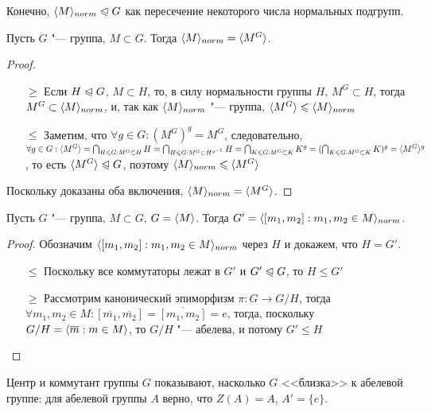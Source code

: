 \begin{note}
	Конечно, $\langle M\rangle_{norm} \trianglelefteqslant G$ как пересечение некоторого числа нормальных подгрупп.
\end{note}

\begin{proposition}
	Пусть $G$ "--- группа, $M \subset G$. Тогда $\gl M\gr_{norm}\hm = \gl M^G\gr$.
\end{proposition}

\begin{proof}~
	\begin{itemize}
		\item[$\ge$] Если $H \trianglelefteqslant G$, $M \subset H$, то, в силу нормальности группы $H$, $M^G \subset H$, тогда $M^G \hm\subset \gl M\gr_{norm}$, и, так как $\langle M\rangle_{norm}$ "--- группа, $\langle M^G\rangle \leqslant \langle M\rangle_{norm}$
		\item[$\le$] Заметим, что $\forall g \in G: (M^G)^g = M^G$, следовательно, $\forall g \in G: \gl M^G\gr \hm= \bigcap_{H \le G: M^G \subset H}H = \bigcap_{H\le G: M^G \subset H^{g^{-1}}}H \hm= \bigcap_{K \le G: M^G \subset K}K^g \hm= (\bigcap_{K \le G: M^G \subset K}K)^g = \gl M^G\gr^g$, то есть $\langle M^G\rangle \trianglelefteqslant G$, поэтому $\langle M\rangle_{norm} \leqslant \langle M^G\rangle$
	\end{itemize}
	Поскольку доказаны оба включения, $\langle M\rangle_{norm} = \langle M^G\rangle$.
\end{proof}

\begin{proposition}
	Пусть $G$ "--- группа, $M \subset G$, $G = \langle M\rangle$. Тогда $G' = \gl [m_1, m_2]: m_1, m_2 \hm\in M\gr_{norm}$.
\end{proposition}

\begin{proof}
	Обозначим $\langle[m_1, m_2]: m_1, m_2 \in M\rangle_{norm}$ через $H$ и докажем, что $H = G'$.
	\begin{itemize}
		\item[$\le$] Поскольку все коммутаторы лежат в $G'$ и $G' \trianglelefteqslant G$, то $H \le G'$
		\item[$\ge$] Рассмотрим канонический эпиморфизм $\pi: G \to G/ H$, тогда $\forall m_1, m_2 \in M: [\overline{m_1}, \overline{m_2}] = \overline{[m_1, m_2]} = e$, тогда, поскольку $G / H = \langle \overline{m}: m \in M\rangle$, то $G / H$ "--- абелева, и потому $G' \le H$
	\end{itemize}
\end{proof}

\begin{note}
	Центр и коммутант группы $G$ показывают, насколько $G$ <<близка>> к абелевой группе: для абелевой группы $A$ верно, что $Z(A) = A$, $A' = \{e\}$.
\end{note}